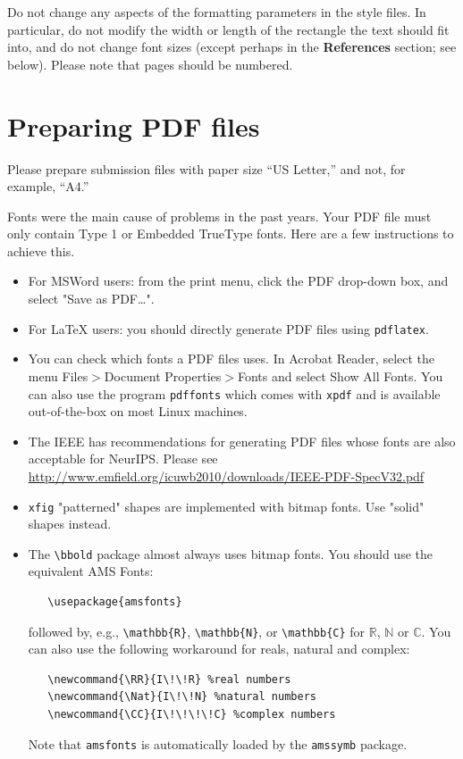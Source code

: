 \documentclass{article}
\begin{document}
Do not change any aspects of the formatting parameters in the style files.  In
particular, do not modify the width or length of the rectangle the text should
fit into, and do not change font sizes (except perhaps in the
\textbf{References} section; see below). Please note that pages should be
numbered.

\section{Preparing PDF files}

Please prepare submission files with paper size ``US Letter,'' and not, for
example, ``A4.''

Fonts were the main cause of problems in the past years. Your PDF file must only
contain Type 1 or Embedded TrueType fonts. Here are a few instructions to
achieve this.

\begin{itemize}

\item For MSWord users: from the print menu, click the PDF drop-down box, and select "Save as PDF…".

\item For \LaTeX{} users: you should directly generate PDF files using \verb+pdflatex+.

\item You can check which fonts a PDF files uses.  In Acrobat Reader, select the
  menu Files$>$Document Properties$>$Fonts and select Show All Fonts. You can
  also use the program \verb+pdffonts+ which comes with \verb+xpdf+ and is
  available out-of-the-box on most Linux machines.

\item The IEEE has recommendations for generating PDF files whose fonts are also
  acceptable for NeurIPS. Please see
  \url{http://www.emfield.org/icuwb2010/downloads/IEEE-PDF-SpecV32.pdf}

\item \verb+xfig+ "patterned" shapes are implemented with bitmap fonts.  Use
  "solid" shapes instead.

\item The \verb+\bbold+ package almost always uses bitmap fonts.  You should use
  the equivalent AMS Fonts:
\begin{verbatim}
   \usepackage{amsfonts}
\end{verbatim}
followed by, e.g., \verb+\mathbb{R}+, \verb+\mathbb{N}+, or \verb+\mathbb{C}+
for $\mathbb{R}$, $\mathbb{N}$ or $\mathbb{C}$.  You can also use the following
workaround for reals, natural and complex:
\begin{verbatim}
   \newcommand{\RR}{I\!\!R} %real numbers
   \newcommand{\Nat}{I\!\!N} %natural numbers
   \newcommand{\CC}{I\!\!\!\!C} %complex numbers
\end{verbatim}
Note that \verb+amsfonts+ is automatically loaded by the \verb+amssymb+ package.

\end{itemize}
\end{document}
